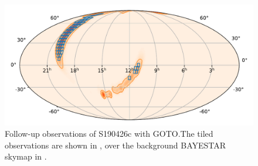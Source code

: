 \begin{colsection}
\begin{colsection}
\begin{figure}[p]
    \begin{center}
        \includegraphics[width=0.9\linewidth]{images/190426_goto.pdf}
    \end{center}
    \caption[Follow-up observations of S190426c with GOTO]{
        Follow-up observations of S190426c with GOTO.\@ The tiled observations are shown in , over the background BAYESTAR skymap in .
        }\label{fig:190426_goto}
\end{figure}

\clearpage

\end{colsection}


\end{colsection}


\newpage
